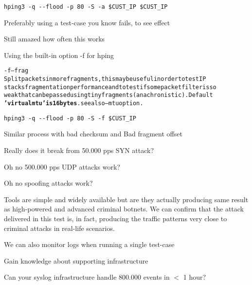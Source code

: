 \documentclass[Screen16to9,17pt]{foils}
\begin{document}
\verb+hping3 -q --flood -p 80 -S -a $CUST_IP $CUST_IP+

Preferably using a test-case you know fails, to see effect

Still amazed how often this works




Using the built-in option -f for hping

\begin{alltt}\small
-f --frag
    Split  packets  in more fragments, this may be useful in order to test IP
    stacks fragmentation performance and to test if some packet filter is  so
    weak  that  can  be  passed using tiny fragments (anachronistic). Default
    {\bf 'virtual mtu' is 16 bytes}. see also --mtu option.
\end{alltt}

\begin{list1}
\item \verb+hping3 -q --flood -p 80 -S -f $CUST_IP+
\item Similar process with bad checksum and Bad fragment offset
\end{list1}



\centerline{Really does it break from 50.000 pps SYN attack?}



\centerline{Oh no 500.000 pps UDP attacks work?}


\centerline{Oh no spoofing attacks work?}





Tools are simple and widely available but are they actually producing same result as high-powered and advanced criminal botnets. We can confirm that the attack delivered in this test is, in fact, producing the traffic patterns very close to criminal attacks in real-life scenarios.

\begin{list2}
\item We can also monitor logs when running a single test-case
\item Gain knowledge about supporting infrastructure
\item Can your syslog infrastructure handle 800.000 events in $<$ 1 hour?
\end{list2}
\end{document}
